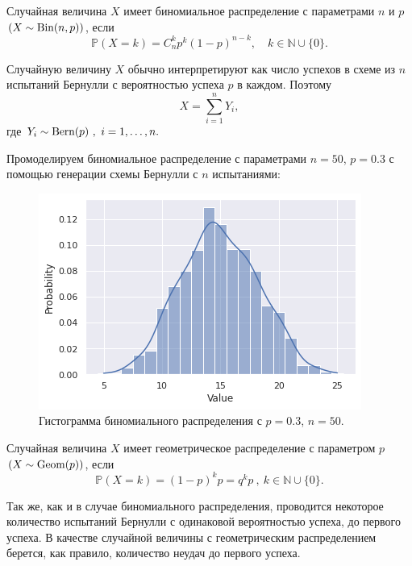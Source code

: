 \begin{definition}
	Случайная величина $X$ имеет биномиальное распределение с параметрами
     $n$ и $p$ $(X \sim \operatorname{\mathrm{Bin}}(n,p))$, если
	$$ \mathbb{P}(X = k) = C^k_n p^k (1 - p)^{n - k}, \quad k \in
     \mathbb{N} \cup \{0\}. $$
\end{definition}

Случайную величину $X$ обычно интерпретируют как число успехов в схеме
 из $n$ испытаний Бернулли с вероятностью успеха $p$ в каждом. Поэтому
$$ X = \sum_{i = 1}^n Y_i ,$$
 где $Y_i \sim \operatorname{\mathrm{Bern}}(p) \ , \ i = 1,\dots,n.$

 Промоделируем биномиальное распределение с параметрами $n = 50$, $p = 0.3$
 с помощью генерации схемы Бернулли с $n$ испытаниями:
 
 \begin{figure}[h]
	\begin{center}
		\includegraphics[width=0.85\linewidth]{"./resources/binominal.png"}
		\caption{Гистограмма биномиального распределения с $p = 0.3$, $n = 50$.}
          \label{fig:bin_dist}
	\end{center}
\end{figure}


\begin{definition}
	Случайная величина $X$ имеет геометрическое распределение с
      параметром $p$ $(X\sim \operatorname{\mathrm{Geom}}(p))$, если
	$$ \mathbb{P}(X = k) = (1 - p)^kp = q^k p \ , \ k \in \mathbb{N} \cup 
     \{0\}. $$
\end{definition}

Так же, как и в случае биномиального распределения, проводится некоторое
 количество испытаний Бернулли с одинаковой вероятностью успеха, до
 первого успеха. В качестве случайной величины с геометрическим распределением
 берется, как правило, количество неудач до первого успеха.

